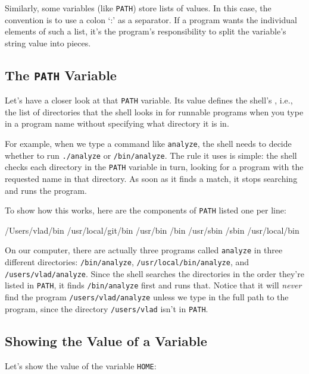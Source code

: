 Similarly, some variables (like \texttt{PATH}) store lists of values. In
this case, the convention is to use a colon `:' as a separator. If a
program wants the individual elements of such a list, it's the program's
responsibility to split the variable's string value into pieces.

\subsection*{The \texttt{PATH} Variable}

Let's have a closer look at that \texttt{PATH} variable. Its value
defines the shell's , i.e., the
list of directories that the shell looks in for runnable programs when
you type in a program name without specifying what directory it is in.

For example, when we type a command like \texttt{analyze}, the shell
needs to decide whether to run \texttt{./analyze} or
\texttt{/bin/analyze}. The rule it uses is simple: the shell checks each
directory in the \texttt{PATH} variable in turn, looking for a program
with the requested name in that directory. As soon as it finds a match,
it stops searching and runs the program.

To show how this works, here are the components of \texttt{PATH} listed
one per line:

\begin{VerbOut}
/Users/vlad/bin
/usr/local/git/bin
/usr/bin
/bin
/usr/sbin
/sbin
/usr/local/bin
\end{VerbOut}

On our computer, there are actually three programs called
\texttt{analyze} in three different directories: \texttt{/bin/analyze},
\texttt{/usr/local/bin/analyze}, and \texttt{/users/vlad/analyze}. Since
the shell searches the directories in the order they're listed in
\texttt{PATH}, it finds \texttt{/bin/analyze} first and runs that.
Notice that it will \emph{never} find the program
\texttt{/users/vlad/analyze} unless we type in the full path to the
program, since the directory \texttt{/users/vlad} isn't in
\texttt{PATH}.

\subsection*{Showing the Value of a Variable}

Let's show the value of the variable \texttt{HOME}:


